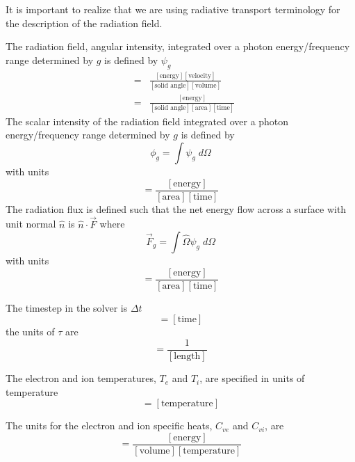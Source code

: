 \documentclass{article}
\newcommand{\units}[1]{\ensuremath{[\mbox{#1}]}}
\begin{document}
It is important to realize that we are using radiative transport terminology
for the description of the radiation field.

The radiation field, angular intensity, integrated over 
a photon energy/frequency range determined by $g$ is defined by $\psi_{g}$
\begin{eqnarray}
     [\psi_{g}] &=& \frac{\units{energy} \units{velocity}}
		         {\units{solid angle} \units{volume}} \\
	        &=& \frac{\units{energy}}
		         {\units{solid angle} \units{area} \units{time}}
\end{eqnarray}
The scalar intensity of the radiation field integrated over 
a photon energy/frequency range determined by $g$ is defined by
\begin{equation}
	\phi_{g} = \int \psi_{g} \; d\Omega
\end{equation}
with units
\begin{equation}
	[\phi_{g}] = \frac{\units{energy}}
		          {\units{area} \units{time}}
\end{equation}
The radiation flux is defined such that the net energy flow across
a surface with unit normal $\hat{n}$ is $\hat{n} \cdot \vec{F}$
where
\begin{equation}
	\vec{F}_{g} = \int \hat{\Omega} \psi_{g} \; d\Omega
\end{equation}
with units
\begin{equation}
	[\vec{F}_{g}] = \frac{\units{energy}}
		         {\units{area}\units{time}}
\end{equation}

The timestep in the solver is $\Delta t$
\begin{equation}
	[\Delta t] = \units{time}
\end{equation}
the units of $\tau$ are
\begin{equation}
	[\tau] = \frac{1}{\units{length}}
\end{equation}

The electron and ion temperatures, $T_{e}$ and $T_{i}$, are specified
in units of temperature
\begin{equation}
	[T] = \units{temperature}
\end{equation}

The units for the electron and ion specific heats, $C_{ve}$ and $C_{vi}$, are 
\begin{equation}
	[C_{v}] = \frac{\units{energy}}{\units{volume}\units{temperature}}
\end{equation}
\end{document}
